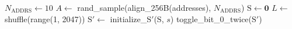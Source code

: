 \begin{algorithm}[b!]
\footnotesize
\caption{1-bit, non-uniform $\mathrm{S}$, test pattern generation \label{alg:sensitivity}}
\begin{algorithmic}[1]
\State $N_{\text{ADDRS}} \gets 10$
\State $A \gets$ rand\_sample(align\_256B(addresses), $N_{\text{ADDRS}}$)
\State $\mathrm{S} \gets \mathbf{0}$
    \State $L \gets$ shuffle(range(1, 2047))
        \State $\mathrm{S}' \gets$ initialize\_$\mathrm{S}'$($\mathrm{S}$, $s$) 
        \State toggle\_bit\_0\_twice($\mathrm{S}'$) 
    \EndFor
\EndFor
\end{algorithmic}
\end{algorithm}